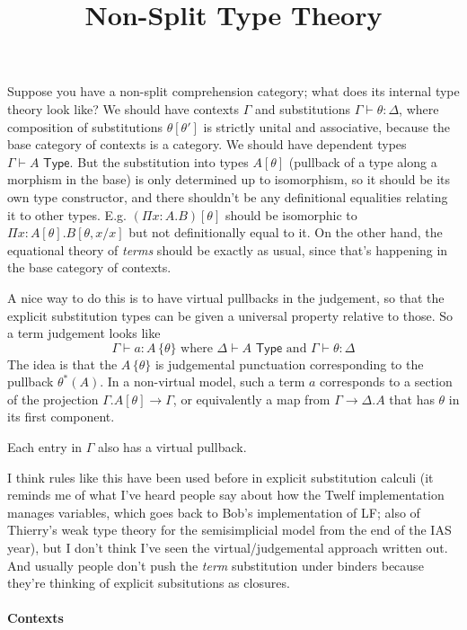 \documentclass[10pt]{article}
\title{Non-Split Type Theory}
\author{}
\newcommand{\TYPE}{\,\,\mathsf{Type}}
\newcommand\vsubst[2]{#1 \, \{ #2 \}}
\begin{document}
\maketitle

Suppose you have a non-split comprehension category; what does its
internal type theory look like?  We should have contexts $\Gamma$ and
substitutions $\Gamma \vdash \theta : \Delta$, where composition of
substitutions $\theta[\theta']$ is strictly unital and associative,
because the base category of contexts is a category.  We should have
dependent types $\Gamma \vdash A \TYPE$.  But the substitution into
types $A[\theta]$ (pullback of a type along a morphism in the base) is
only determined up to isomorphism, so it should be its own type
constructor, and there shouldn't be any definitional equalities relating
it to other types.  E.g. $(\Pi x:A.B)[\theta]$ should be isomorphic to
$\Pi x:A[\theta].B[\theta,x/x]$ but not definitionally equal to it.
On the other hand, the equational theory of \emph{terms} should be
exactly as usual, since that's happening in the base category of
contexts.   

A nice way to do this is to have virtual pullbacks in the judgement, so
that the explicit substitution types can be given a universal property
relative to those.  So a term judgement looks like
\[
\Gamma \vdash a : \vsubst A \theta \text { where } \Delta \vdash A \TYPE
\text{ and } \Gamma \vdash \theta : \Delta
\]
The idea is that the $\vsubst A \theta$ is judgemental punctuation
corresponding to the pullback $\theta^*(A)$.  In a non-virtual model,
such a term $a$ corresponds to a section of the projection
$\Gamma.A[\theta] \to \Gamma$, or equivalently a map from $\Gamma \to
\Delta.A$ that has $\theta$ in its first component.  

Each entry in $\Gamma$ also has a virtual pullback.

I think rules like this have been used before in explicit substitution
calculi (it reminds me of what I've heard people say about how the Twelf
implementation manages variables, which goes back to Bob's
implementation of LF; also of Thierry's weak type theory for the
semisimplicial model from the end of the IAS year), but I don't think
I've seen the virtual/judgemental approach written out.  And usually
people don't push the \emph{term} substitution under binders because
they're thinking of explicit subsitutions as closures.

\paragraph{Contexts}
\end{document}
